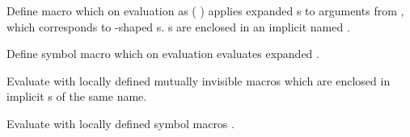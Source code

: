 \begin{LIST}{1cm}

  {
    Define macro  which on evaluation as (
    ) applies expanded s to arguments from
    , which corresponds to -shaped
    s. s are enclosed in an implicit
     named .
  }
  
  {
    Define symbol macro  which on evaluation
    evaluates expanded .
  }
  
  {
    Evaluate  with locally defined mutually
    invisible macros  which are enclosed in implicit
    s of the same name.
  }

  {
    Evaluate  with locally defined symbol macros
    .
  }


\end{LIST}
